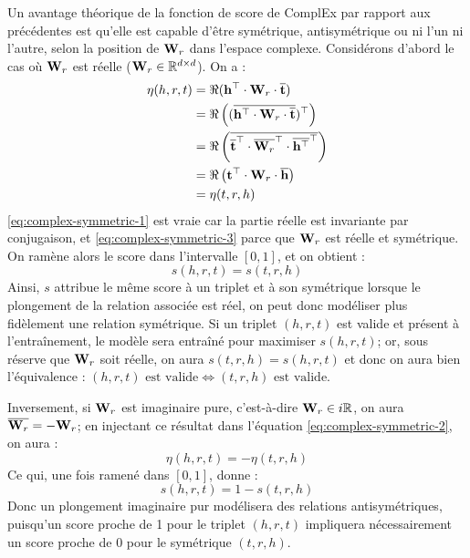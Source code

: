 Un avantage théorique de la fonction de score de ComplEx par rapport aux précédentes est qu'elle est capable d'être symétrique, antisymétrique ou ni l'un ni l'autre, selon la position de $\bf{W}_r$ dans l'espace complexe. Considérons d'abord le cas où $\bf{W}_r$ est réelle ($\bf{W}_r \in \R^{d \times d}$). On a :
\begin{align}
    \eta(h, r, t) &= \Re(\bf{h^\top \cdot W}_r \cdot \compconj{\bf{t}}) \\
    &= \Re\left((\compconj{\bf{h^\top \cdot W}_r \cdot \compconj{\bf{t}}})^\top\right) \label{eq:complex-symmetric-1} \\
    &= \Re\left( \compconj{\compconj{\bf{t}}^\top \cdot \compconj{\bf{W}_r}^\top \cdot 
    \compconj{\bf{h^\top}}^\top}\right) \label{eq:complex-symmetric-2} \\
    &= \Re\left(\bf{t}^\top \cdot \bf{W}_r \cdot \compconj{\bf{h}}\right) \label{eq:complex-symmetric-3} \\
    &= \eta(t, r, h)
\end{align}
\ref{eq:complex-symmetric-1} est vraie car la partie réelle est invariante par conjugaison, et \ref{eq:complex-symmetric-3} parce que $\bf{W}_r$ est réelle et symétrique. On ramène alors le score dans l'intervalle $[0, 1]$, et on obtient :
\begin{equation}
    s(h, r, t) = s(t, r, h)
\end{equation}
Ainsi, $s$ attribue le même score à un triplet et à son symétrique lorsque le plongement de la relation associée est réel, on peut donc modéliser plus fidèlement une relation symétrique. 
Si un triplet $(h, r, t)$ est valide et présent à l'entraînement, le modèle sera entraîné pour maximiser $s(h, r, t)$; or, sous réserve que $\bf{W}_r$ soit réelle, on aura $s(t, r, h) = s(h, r, t)$ et donc on aura bien l'équivalence : $(h, r, t) \text{ est valide} \iff (t, r, h) \text{ est valide}$.

Inversement, si $\bf{W}_r$ est imaginaire pure, c'est-à-dire $\bf{W}_r \in i\R$, on aura $\compconj{\bf{W}_r} = - \bf{W}_r$; en injectant ce résultat dans l'équation \ref{eq:complex-symmetric-2}, on aura :
\begin{equation}
    \eta(h, r, t) = - \eta(t, r, h)
\end{equation}
Ce qui, une fois ramené dans $[0, 1]$, donne :
\begin{equation}
    s(h, r, t) = 1 - s(t, r, h)
\end{equation}
Donc un plongement imaginaire pur modélisera des relations antisymétriques, puisqu'un score proche de 1 pour le triplet $(h, r, t)$ impliquera nécessairement un score proche de 0 pour le symétrique $(t, r, h)$. 

